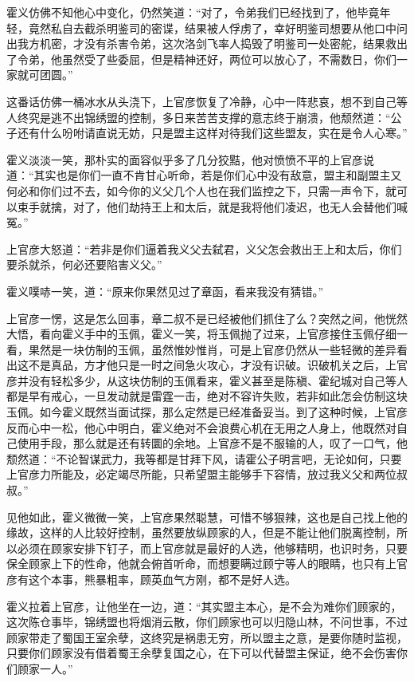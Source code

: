 霍义仿佛不知他心中变化，仍然笑道：“对了，令弟我们已经找到了，他毕竟年轻，竟然私自去截杀明鉴司的密谍，结果被人俘虏了，幸好明鉴司想要从他口中问出我方机密，才没有杀害令弟，这次洛剑飞率人捣毁了明鉴司一处密舵，结果救出了令弟，他虽然受了些委屈，但是精神还好，两位可以放心了，不需数日，你们一家就可团圆。”

这番话仿佛一桶冰水从头浇下，上官彦恢复了冷静，心中一阵悲哀，想不到自己等人终究是逃不出锦绣盟的控制，多日来苦苦支撑的意志终于崩溃，他颓然道：“公子还有什么吩咐请直说无妨，只是盟主这样对待我们这些盟友，实在是令人心寒。”

霍义淡淡一笑，那朴实的面容似乎多了几分狡黠，他对愤愤不平的上官彦说道：“其实也是你们一直不肯甘心听命，若是你们心中没有敌意，盟主和副盟主又何必和你们过不去，如今你的义父几个人也在我们监控之下，只需一声令下，就可以束手就擒，对了，他们劫持王上和太后，就是我将他们凌迟，也无人会替他们喊冤。”

上官彦大怒道：“若非是你们逼着我义父去弑君，义父怎会救出王上和太后，你们要杀就杀，何必还要陷害义父。”

霍义噗哧一笑，道：“原来你果然见过了章函，看来我没有猜错。”

上官彦一愣，这是怎么回事，章二叔不是已经被他们抓住了么？突然之间，他恍然大悟，看向霍义手中的玉佩，霍义一笑，将玉佩抛了过来，上官彦接住玉佩仔细一看，果然是一块仿制的玉佩，虽然惟妙惟肖，可是上官彦仍然从一些轻微的差异看出这不是真品，方才他只是一时之间急火攻心，才没有识破。识破机关之后，上官彦并没有轻松多少，从这块仿制的玉佩看来，霍义甚至是陈稹、霍纪城对自己等人都是早有戒心，一旦发动就是雷霆一击，绝对不容许失败，若非如此怎会仿制这块玉佩。如今霍义既然当面试探，那么定然是已经准备妥当。到了这种时候，上官彦反而心中一松，他心中明白，霍义绝对不会浪费心机在无用之人身上，他既然对自己使用手段，那么就是还有转圜的余地。上官彦不是不服输的人，叹了一口气，他颓然道：“不论智谋武力，我等都是甘拜下风，请霍公子明言吧，无论如何，只要上官彦力所能及，必定竭尽所能，只希望盟主能够手下容情，放过我义父和两位叔叔。”

见他如此，霍义微微一笑，上官彦果然聪慧，可惜不够狠辣，这也是自己找上他的缘故，这样的人比较好控制，虽然要放纵顾家的人，但是不能让他们脱离控制，所以必须在顾家安排下钉子，而上官彦就是最好的人选，他够精明，也识时务，只要保全顾家上下的性命，他就会俯首听命，而想要瞒过顾宁等人的眼睛，也只有上官彦有这个本事，熊暴粗率，顾英血气方刚，都不是好人选。

霍义拉着上官彦，让他坐在一边，道：“其实盟主本心，是不会为难你们顾家的，这次陈仓事毕，锦绣盟也将烟消云散，你们顾家也可以归隐山林，不问世事，不过顾家带走了蜀国王室余孽，这终究是祸患无穷，所以盟主之意，是要你随时监视，只要你们顾家没有借着蜀王余孽复国之心，在下可以代替盟主保证，绝不会伤害你们顾家一人。”

